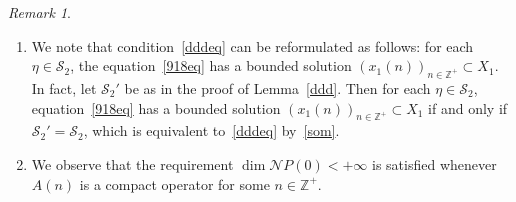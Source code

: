 \documentclass[11pt,reqno,a4paper]{amsart}
\theoremstyle{plain}
\numberwithin{equation}{section}
\theoremstyle{remark}
\newtheorem{remark}{Remark}
\def\Z{\mathbb{Z}}
\begin{document}
\begin{remark}\label{1157rem}
\begin{enumerate}
\item We note that condition~\eqref{dddeq} can be reformulated as follows: for each $\eta \in \mathcal S_2$, the equation~\eqref{918eq} has a bounded solution $(x_1(n))_{n\in \Z^+}\subset X_1$. 
In fact, let $\mathcal S_2'$ be as in the proof of Lemma~\ref{ddd}. Then for each $\eta \in \mathcal S_2$, equation~\eqref{918eq} has a bounded solution $(x_1(n))_{n\in \Z^+}\subset X_1$ if and only if $\mathcal S_2'=\mathcal S_2$, which is equivalent to~\eqref{dddeq} by~\eqref{som}.
\item We observe that the requirement $\dim \mathcal NP(0)<+\infty$ is satisfied whenever $A(n)$ is a compact operator for some $n\in \Z^+$. 
\end{enumerate}
\end{remark}
\end{document}
